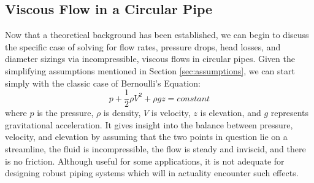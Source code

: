 \documentclass[10pt]{article} %
\numberwithin{equation}{section} %
\begin{document}
\begin{multicols}{2}
\begin{enumerate}
\end{enumerate}


\subsection{Viscous Flow in a Circular Pipe}

Now that a theoretical background has been established, we can begin to discuss the specific case of solving for flow rates, pressure drops, head losses, and diameter sizings via incompressible, viscous flows in circular pipes. Given the simplifying assumptions mentioned in Section \ref{sec:assumptions}, we can start simply with the classic case of Bernoulli's Equation:
\begin{equation} \label{eq:bernoulli}
p + \frac{1}{2} \rho V^{2} + \rho g z = constant
\end{equation}
where $p$ is the pressure, $\rho$ is density, $V$ is velocity, $z$ is elevation, and $g$ represents gravitational acceleration. It gives insight into the balance between pressure, velocity, and elevation by assuming that the two points in question lie on a streamline, the fluid is incompressible, the flow is steady and inviscid, and there is no friction. Although useful for some applications, it is not adequate for designing robust piping systems which will in actuality encounter such effects.


\end{multicols}
\end{document}
